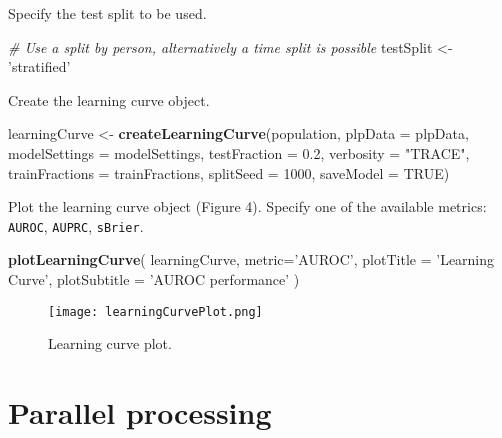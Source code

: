 \documentclass[
]{article}
\newenvironment{Shaded}{\begin{snugshade}}{\end{snugshade}}
\newcommand{\CommentTok}[1]{\textcolor[rgb]{0.56,0.35,0.01}{\textit{#1}}}
\newcommand{\DataTypeTok}[1]{\textcolor[rgb]{0.13,0.29,0.53}{#1}}
\newcommand{\DecValTok}[1]{\textcolor[rgb]{0.00,0.00,0.81}{#1}}
\newcommand{\FloatTok}[1]{\textcolor[rgb]{0.00,0.00,0.81}{#1}}
\newcommand{\KeywordTok}[1]{\textcolor[rgb]{0.13,0.29,0.53}{\textbf{#1}}}
\newcommand{\NormalTok}[1]{#1}
\newcommand{\OtherTok}[1]{\textcolor[rgb]{0.56,0.35,0.01}{#1}}
\newcommand{\StringTok}[1]{\textcolor[rgb]{0.31,0.60,0.02}{#1}}
\begin{document}
Specify the test split to be used.

\begin{Shaded}
\begin{Highlighting}[]
\CommentTok{# Use a split by person, alternatively a time split is possible}
\NormalTok{testSplit <-}\StringTok{ 'stratified'}
\end{Highlighting}
\end{Shaded}

Create the learning curve object.

\begin{Shaded}
\begin{Highlighting}[]
\NormalTok{learningCurve <-}\StringTok{ }\KeywordTok{createLearningCurve}\NormalTok{(population,}
                                     \DataTypeTok{plpData =}\NormalTok{ plpData,}
                                     \DataTypeTok{modelSettings =}\NormalTok{ modelSettings,}
                                     \DataTypeTok{testFraction =} \FloatTok{0.2}\NormalTok{,}
                                     \DataTypeTok{verbosity =} \StringTok{"TRACE"}\NormalTok{,}
                                     \DataTypeTok{trainFractions =}\NormalTok{ trainFractions,}
                                     \DataTypeTok{splitSeed =} \DecValTok{1000}\NormalTok{,}
                                     \DataTypeTok{saveModel =} \OtherTok{TRUE}\NormalTok{)}
\end{Highlighting}
\end{Shaded}

Plot the learning curve object (Figure 4). Specify one of the available
metrics: \texttt{AUROC}, \texttt{AUPRC}, \texttt{sBrier}.

\begin{Shaded}
\begin{Highlighting}[]
\KeywordTok{plotLearningCurve}\NormalTok{(}
\NormalTok{  learningCurve,}
  \DataTypeTok{metric=}\StringTok{'AUROC'}\NormalTok{,}
  \DataTypeTok{plotTitle =} \StringTok{'Learning Curve'}\NormalTok{,}
  \DataTypeTok{plotSubtitle =} \StringTok{'AUROC performance'}
\NormalTok{)}
\end{Highlighting}
\end{Shaded}

\begin{figure}
\centering
\texttt{[image: learningCurvePlot.png]}
\caption{Learning curve plot.}
\end{figure}

\hypertarget{parallel-processing}{%
\section{Parallel processing}\label{parallel-processing}}
\end{document}
